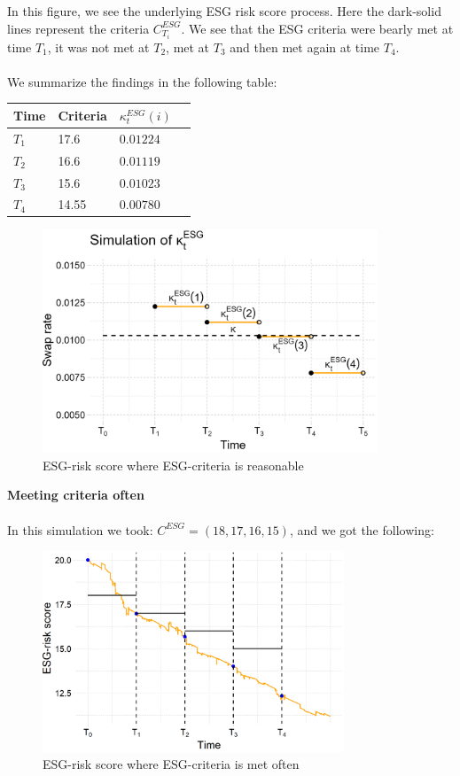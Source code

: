 In this figure, we see the underlying ESG risk score process. Here the dark-solid lines represent the criteria $C_{T_{i}}^{ESG}$. We see that the ESG criteria were bearly met at time $T_{1}$, it was not met at $T_{2}$, met at $T_{3}$ and then met again at time $T_{4}$. 
\\~\\ 
We summarize the findings in the following table:
\begin{center}
    \begin{tabular}{ | l | l | l | p{5cm} |}
    \hline
    Time    &   Criteria  & $\kappa_{t}^{ESG}(i)$ \\ \hline
    $T_{1}$ &      17.6   & $0.01224$  \\ \hline
    $T_{2}$ &      16.6   & $0.01119$  \\ \hline
    $T_{3}$ &      15.6   & $0.01023$  \\ \hline
    $T_{4}$ &      14.55  & $0.00780$   \\ \hline
    \end{tabular}
\end{center} 

\begin{figure}[htp]
    \centering
    \includegraphics[width= 10cm]{figures/ESG/kappa_t_ESG_1.png}
    \caption{ESG-risk score where ESG-criteria is reasonable}
    \label{fig: ESG_swap_1}
\end{figure}

\newpage 

\textbf{Meeting criteria often}
\\~\\ 
In this simulation we took: $C^{ESG} = (18,17,16,15)$, and we got the following: 

\begin{figure}[htp]
    \centering
    \includegraphics[width= 9cm]{figures/ESG/ESG_plt_criteria2.png}
    \caption{ESG-risk score where ESG-criteria is met often}
    \label{fig: ESG-risk_score_criteri2}
\end{figure}

